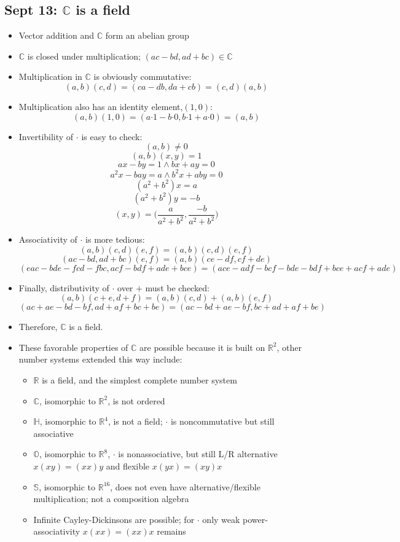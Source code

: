 \documentclass[10pt, oneside]{article}
\newcommand{\R}{\mathbb{R}}
\newcommand{\C}{\mathbb{C}}
\newcommand{\Cdot}{\boldsymbol{\cdot}}
\begin{document}
\subsection{Sept 13: $\C$ is a field}
\begin{itemize}
    \item Vector addition and $\C$ form an abelian group
    \item $\C$ is closed under multiplication; $(ac-bd,ad+bc) \in \C$ 
    \item Multiplication in $\C$ is obviously commutative:
        \[(a,b)(c,d) = (ca-db,da+cb) = (c,d)(a,b)\]
    \item Multiplication also has an identity element,$(1,0)$:
        \[(a,b)(1,0) = (a \Cdot 1 - b \Cdot 0, b \Cdot 1 + a \Cdot 0) = (a,b)\]
    \item Invertibility of $ \Cdot $ is easy to check:
        \[(a,b) \neq 0\]
        \[(a,b)(x,y) = 1\]
        \[ax-by = 1 \land bx+ay = 0\]
        \[a^2 x - bay = a \land b^2 x + aby = 0\]
        \[(a^2 + b^2)x = a\]
        \[(a^2 + b^2)y = -b\]
        \[(x,y) = \Big( \frac{a}{a^2+b^2},\frac{-b}{a^2+b^2} \Big)\]
    \item Associativity of $ \Cdot $ is more tedious:
        \[(a,b)(c,d)(e,f) = (a,b)(c,d)(e,f)\]
        \[(ac-bd,ad+bc)(e,f) = (a,b)(ce-df,cf+de)\]
        \[(eac-bde-fcd-fbc,acf-bdf+ade+bce) = (ace-adf-bcf-bde-bdf+bce+acf+ade)\]
    \item Finally, distributivity of $ \Cdot $ over $+$ must be checked:
        \[(a,b)(c+e,d+f) = (a,b)(c,d) + (a,b)(e,f)\]
        \[(ac+ae-bd-bf,ad+af+bc+be)=(ac-bd+ae-bf,bc+ad+af+be)\]
    \item Therefore, $\C$ is a field.
    \item These favorable properties of $\C$ are possible because it is built on $\R^2$, other number systems extended this way include:
    \begin{itemize}
        \item $\R$ is a field, and the simplest complete number system
        \item $\C$, isomorphic to $\R^2$, is not ordered
        \item $\mathbb{H}$, isomorphic to $\R^4$, is not a field; $\Cdot$ is noncommutative but still associative
        \item $\mathbb{O}$, isomorphic to $\R^8$, $\Cdot$ is nonassociative, but still L/R alternative $x(xy)=(xx)y$ and flexible $x(yx)=(xy)x$
        \item $\mathbb{S}$, isomorphic to $\R^{16}$, does not even have alternative/flexible multiplication; not a composition algebra
        \item Infinite Cayley-Dickinsons are possible; for $\Cdot$ only weak power-associativity $x(xx)=(xx)x$ remains 
    \end{itemize}
\end{itemize}
\end{document}
